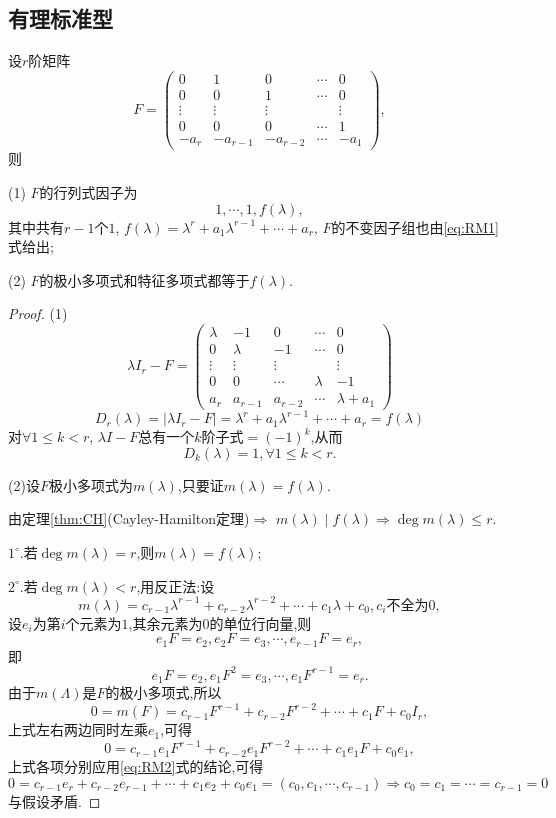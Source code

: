 \subsection{有理标准型}
\begin{theory}\label{thr:RM1}
  设$r$阶矩阵
  \begin{equation}\label{eq:RM0}
    F= \begin{pmatrix}
    0 & 1 & 0 & \cdots & 0\\
    0 & 0 & 1 & \cdots & 0\\
    \vdots&\vdots&\vdots&&\vdots\\
    0 & 0 & 0 & \cdots & 1\\
    -a_r & -a_{r-1} & -a_{r-2} & \cdots & -a_1
    \end{pmatrix},
  \end{equation}
则

(1) $F$的行列式因子为
\begin{equation}\label{eq:RM1}
  1,\cdots,1,f(\lambda),
\end{equation}
其中共有$r-1$个$1$, $f(\lambda)=\lambda^r+a_1\lambda^{r-1}+\cdots+a_r$, 
$F$的不变因子组也由\eqref{eq:RM1}式给出;

(2) $F$的极小多项式和特征多项式都等于$f(\lambda)$.
\end{theory}
\begin{proof}
  (1) \[\lambda I_r-F=
  \begin{pmatrix}
    \lambda &-1& 0 & \cdots & 0\\
    0 &\lambda & -1 & \cdots & 0\\
    \vdots&\vdots&\vdots&&\vdots\\
    0 & 0 &\cdots &\lambda & -1\\
    a_r & a_{r-1} & a_{r-2} & \cdots &\lambda+a_1
  \end{pmatrix}\]
\[D_r(\lambda)=|\lambda I_r-F|=\lambda^r+a_1\lambda^{r-1}+\cdots+a_r=f(\lambda)\]
对$\forall 1 \leq k < r$, $\lambda I-F$总有一个$k$阶子式$=(-1)^k$,从而
\[D_k(\lambda)=1, \forall 1 \leq k < r.\]

(2)设$F$极小多项式为$m(\lambda)$,只要证$m(\lambda)=f(\lambda)$.

由定理\ref{thm:CH}(Cayley-Hamilton定理)$\Longrightarrow$
$m(\lambda) \mid f(\lambda) \Longrightarrow \deg m(\lambda)\leq r$.

$1^{\circ}$.若$\deg m(\lambda)=r$,则$m(\lambda)=f(\lambda)$;

$2^{\circ}$.若$\deg m(\lambda)<r$,用反正法:设
\[m(\lambda)=c_{r-1}\lambda^{r-1}+c_{r-2}\lambda^{r-2}+
  \cdots+c_1\lambda+c_0, c_i\text{不全为}0,\]
设$e_i$为第$i$个元素为$1$,其余元素为$0$的单位行向量,则
\[e_1F=e_2,e_2F=e_3,\cdots,e_{r-1}F=e_r,\]
即
\begin{equation}\label{eq:RM2}
  e_1F=e_2,e_1F^2=e_3,\cdots,e_1F^{r-1}=e_r.
\end{equation}
由于$m(\Lambda)$是$F$的极小多项式,所以
\[0=m(F)=c_{r-1}F^{r-1}+c_{r-2}F^{r-2}+
  \cdots+c_1F+c_0I_r,\]
上式左右两边同时左乘$e_1$,可得
\[0=c_{r-1}e_1F^{r-1}+c_{r-2}e_1F^{r-2}+
  \cdots+c_1e_1F+c_0e_1,\]
上式各项分别应用\eqref{eq:RM2}式的结论,可得
\[0=c_{r-1}e_r+c_{r-2}e_{r-1}+
  \cdots+c_1e_2+c_0e_1=(c_0,c_1,\cdots,c_{r-1})
  \Longrightarrow c_0=c_1=\cdots=c_{r-1}=0\]
与假设矛盾.
\end{proof}
